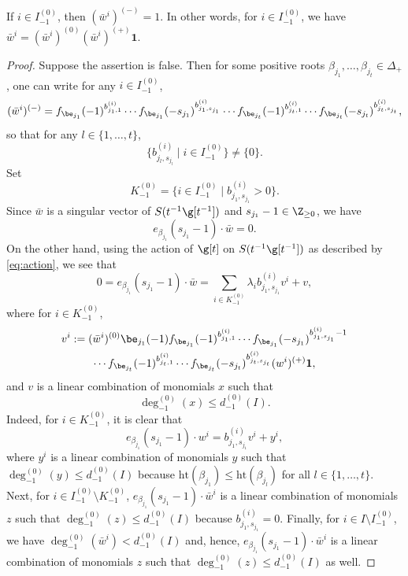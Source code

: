 \begin{lem}
\label{lem:wi_-}
If $i\in I_{-1}^{(0)}$, then $(\bar w^i)^{(-)}=1$. In
other words, for $i \in I_{-1}^{(0)}$, we have
$\bar w^{i}= (\bar w^{i})^{(0)} (\bar w^{i})^{(+)} \mathbf{1}.$
\end{lem}
\begin{proof} Suppose the assertion is false.
Then for some positive roots $\beta_{j_1},\dots,\beta_{j_t} \in \Delta_+$,
one can write for any $i \in I_{-1}^{(0)}$,
\begin{equation}\label{e5}
(\bar w^i)^{(-)}=f_{\be_{j_1}}(-1)^{b_{j_1,1}^{(i)}}
\cdots f_{\be_{j_1}}(-s_{j_1})^{b_{j_1,s_{j_1}}^{(i)}}\cdots
f_{\be_{j_t}}(-1)^{b_{j_t,1}^{(i)}}
\cdots f_{\be_{j_t}}(-s_{j_t})^{b_{j_t,s_{j_t}}^{(i)}},
\end{equation}
so that for any $l \in \{1,\dots,t\}$,
\[
\{b_{j_l,s_{j_l}}^{(i)} \mid i \in I_{-1}^{(0)}\}\neq \{0\}.
\]
Set
\[
K_{-1}^{(0)} = \{i \in I_{-1}^{(0)} \mid b_{j_1,s_{j_1}}^{(i)}> 0 \}.
\]
Since $\bar w$ is a singular vector of $S(t^{-1}\g[t^{-1}])$ and $s_{j_1}-1 \in\Z_{\geq 0}$,
we have
\[
e_{\beta_{j_1}}(s_{j_1}-1)\cdot\bar w=0.
\]
On the other hand, using the action of $\g[t]$ on $S(t^{-1}\g[t^{-1}])$
as described by \eqref{eq:action}, we see that
\begin{equation}
\label{eq:wi_-}
0=e_{\beta_{j_1}}(s_{j_1}-1) \cdot\bar w =
\sum_{i \in K_{-1}^{(0)}} \lambda_ib_{j_1,s_{j_1}}^{(i)} v^{i} + v,
\end{equation}
where for $i \in K_{-1}^{(0)}$,
\begin{multline*}
v^{i}:=
(\bar w^{i})^{(0)} {\be_{j_1}(-1)}
f_{\be_{j_1}}(-1)^{b_{j_1,1}^{(i)}}
\cdots f_{\be_{j_1}}(-s_{j_1})^{b_{j_1,s_{j_1}}^{(i)}-1}\\
\cdots
f_{\be_{j_t}}(-1)^{b_{j_t,1}^{(i)}}
\cdots f_{\be_{j_t}}(-s_{j_t})^{b_{j_t,s_{j_t}}^{(i)}} (w^{i})^{(+)} \mathbf{1},
\end{multline*}
and $v$ is a linear combination of monomials $x$
such that
\[
\deg_{-1}^{(0)}(x) \leq d_{-1}^{(0)}(I).
\]
Indeed, for $i \in K_{-1}^{(0)}$, it is clear that
\begin{equation*}
e_{\beta_{j_1}}(s_{j_1}-1)\cdot w^{i} = b_{j_1,s_{j_1}}^{(i)} v^{i} + y^{i},
\end{equation*}
where $y^{i}$ is a linear combination of monomials $y$
such that
$\deg_{-1}^{(0)}(y) \leq d_{-1}^{(0)}(I)$ because
$\mathrm{ht}(\beta_{j_1}) \leq \mathrm{ht}(\beta_{j_l})$
for all $l \in \{1,\dots,t\}$.
Next, for $i \in I_{-1}^{(0)} \setminus K_{-1}^{(0)}$,
$e_{\beta_{j_1}} (s_{j_1}-1)\cdot\bar w^{i} $ is a
linear combination of monomials $z$ such that
$\deg_{-1}^{(0)}(z) \leq d_{-1}^{(0)}(I)$ because
$b_{j_1,s_{j_1}}^{(i)}=0$.
Finally, for $i \in I \setminus I_{-1}^{(0)}$, we have $\deg_{-1}^{(0)}(\bar w^{i}) < d_{-1}^{(0)}(I) $
and, hence, $e_{\beta_{j_1}}(s_{j_1}-1) \cdot\bar w^{i} $ is a
linear combination of monomials $z$ such that
$\deg_{-1}^{(0)}(z) \leq d_{-1}^{(0)}(I)$ as well.


\end{proof}
